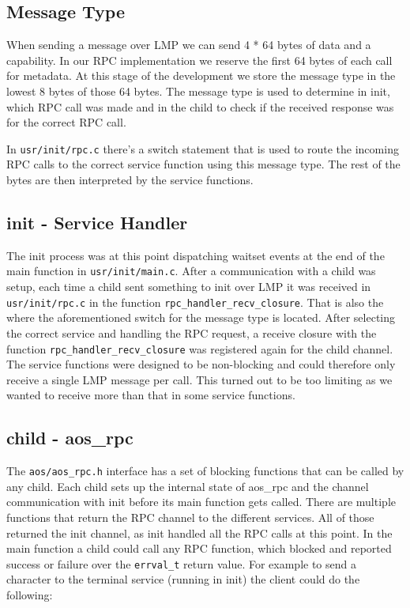 \subsection{Message Type}
When sending a message over LMP we can send 4 * 64 bytes of data and a capability. In our RPC implementation we reserve the first 64 bytes of each call for metadata. At this stage of the development we store the message type in the lowest 8 bytes of those 64 bytes. The message type is used to determine in init, which RPC call was made and in the child to check if the received response was for the correct RPC call.

In \verb|usr/init/rpc.c| there's a switch statement that is used to route the incoming RPC calls to the correct service function using this message type. The rest of the bytes are then interpreted by the service functions.

\subsection{init - Service Handler}
The init process was at this point dispatching waitset events at the end of the main function in \verb|usr/init/main.c|. After a communication with a child was setup, each time a child sent something to init over LMP it was received in \verb|usr/init/rpc.c| in the function \verb|rpc_handler_recv_closure|. That is also the where the aforementioned switch for the message type is located.
After selecting the correct service and handling the RPC request, a receive closure with the function \verb|rpc_handler_recv_closure| was registered again for the child channel. The service functions were designed to be non-blocking and could therefore only receive a single LMP message per call. This turned out to be too limiting as we wanted to receive more than that in some service functions.

\subsection{child - aos\_rpc}
The \verb|aos/aos_rpc.h| interface has a set of blocking functions that can be called by any child. Each child sets up the internal state of aos\_rpc and the channel communication with init before its main function gets called. There are multiple functions that return the RPC channel to the different services. All of those returned the init channel, as init handled all the RPC calls at this point.
In the main function a child could call any RPC function, which blocked and reported success or failure over the \verb|errval_t| return value. For example to send a character to the terminal service (running in init) the client could do the following:

